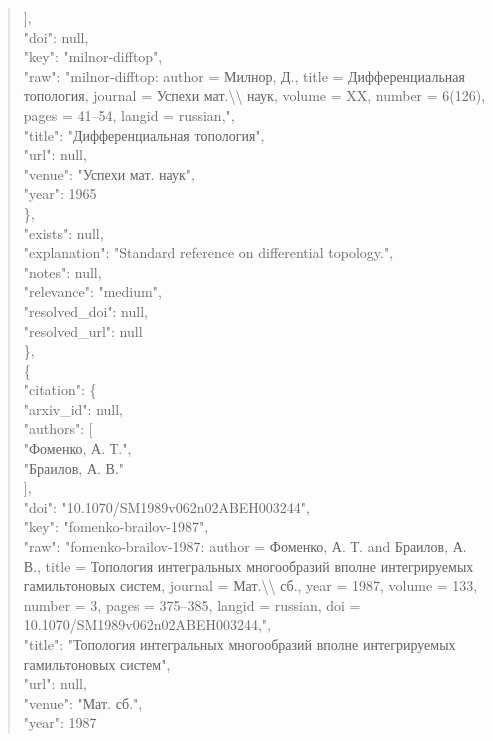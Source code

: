 \documentclass[11pt]{article}
\begin{document}
\begin{quote}
        ],\\
        "doi": null,\\
        "key": "milnor-difftop",\\
        "raw": "milnor-difftop: author = Милнор, Д., title = Дифференциальная топология, journal = Успехи мат.\textbackslash{}\textbackslash{} наук, volume = XX, number = 6(126), pages = 41--54, langid = russian,",\\
        "title": "Дифференциальная топология",\\
        "url": null,\\
        "venue": "Успехи мат. наук",\\
        "year": 1965\\
      \},\\
      "exists": null,\\
      "explanation": "Standard reference on differential topology.",\\
      "notes": null,\\
      "relevance": "medium",\\
      "resolved\_doi": null,\\
      "resolved\_url": null\\
    \},\\
    \{\\
      "citation": \{\\
        "arxiv\_id": null,\\
        "authors": [\\
          "Фоменко, А. Т.",\\
          "Браилов, А. В."\\
        ],\\
        "doi": "10.1070/SM1989v062n02ABEH003244",\\
        "key": "fomenko-brailov-1987",\\
        "raw": "fomenko-brailov-1987: author = Фоменко, А. Т. and Браилов, А. В., title = Топология интегральных многообразий вполне интегрируемых гамильтоновых систем, journal = Мат.\textbackslash{}\textbackslash{} сб., year = 1987, volume = 133, number = 3, pages = 375--385, langid = russian, doi = 10.1070/SM1989v062n02ABEH003244,",\\
        "title": "Топология интегральных многообразий вполне интегрируемых гамильтоновых систем",\\
        "url": null,\\
        "venue": "Мат. сб.",\\
        "year": 1987\\

\end{quote}
\end{document}
